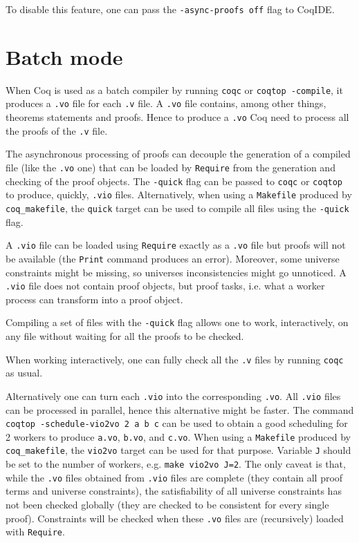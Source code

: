 To disable this feature, one can pass the \texttt{-async-proofs off} flag to
CoqIDE.

\section{Batch mode}

When Coq is used as a batch compiler by running \texttt{coqc} or
\texttt{coqtop -compile}, it produces a \texttt{.vo} file for each
\texttt{.v} file. A \texttt{.vo} file contains, among other things,
theorems statements and proofs. Hence to produce a \texttt{.vo} Coq need
to process all the proofs of the \texttt{.v} file.

The asynchronous processing of proofs can decouple the generation of a
compiled file (like the \texttt{.vo} one) that can be loaded by
\texttt{Require} from the generation and checking of the proof objects.
The \texttt{-quick} flag can be passed to \texttt{coqc} or
\texttt{coqtop} to produce, quickly, \texttt{.vio} files. Alternatively,
when using a \texttt{Makefile} produced by \texttt{coq\_makefile}, the
\texttt{quick} target can be used to compile all files using the
\texttt{-quick} flag.

A \texttt{.vio} file can be loaded using \texttt{Require} exactly as a
\texttt{.vo} file but proofs will not be available (the \texttt{Print}
command produces an error). Moreover, some universe constraints might be
missing, so universes inconsistencies might go unnoticed. A
\texttt{.vio} file does not contain proof objects, but proof tasks,
i.e. what a worker process can transform into a proof object.

Compiling a set of files with the \texttt{-quick} flag allows one to work,
interactively, on any file without waiting for all the proofs to be checked.

When working interactively, one can fully check all the \texttt{.v} files by
running \texttt{coqc} as usual.

Alternatively one can turn each \texttt{.vio} into the corresponding
\texttt{.vo}.  All \texttt{.vio} files can be processed in parallel,
hence this alternative might be faster. The command \texttt{coqtop
 -schedule-vio2vo 2 a b c} can be used to obtain a good scheduling for 2
workers to produce \texttt{a.vo}, \texttt{b.vo}, and \texttt{c.vo}. When
using a \texttt{Makefile} produced by \texttt{coq\_makefile}, the
\texttt{vio2vo} target can be used for that purpose.  Variable \texttt{J}
should be set to the number of workers, e.g. \texttt{make vio2vo J=2}.
The only caveat is that, while the \texttt{.vo} files obtained from
\texttt{.vio} files are complete (they contain all proof terms and
universe constraints), the satisfiability of all universe constraints has
not been checked globally (they are checked to be consistent for every
single proof). Constraints will be checked when these \texttt{.vo} files
are (recursively) loaded with \texttt{Require}.

